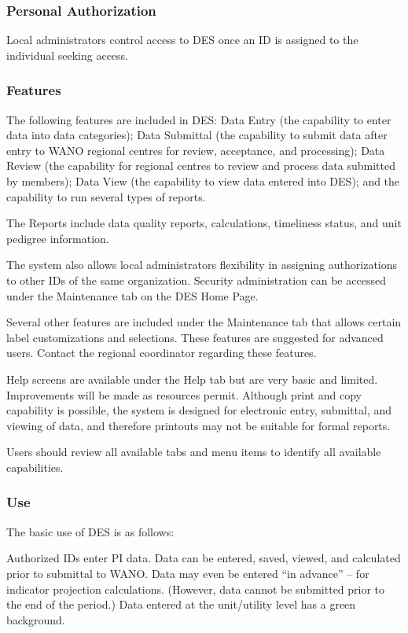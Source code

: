 \subsubsection{Personal Authorization}

Local administrators control access to DES once an ID is assigned to the individual seeking access.

\subsubsection{Features}

The following features are included in DES:  Data Entry (the capability to enter data into data categories); Data Submittal (the capability to submit data after entry to WANO regional centres for review, acceptance, and processing); Data Review (the capability for regional centres to review and process data submitted by members); Data View (the capability to view data entered into DES); and the capability to run several types of reports.

The Reports include data quality reports, calculations, timeliness status, and unit pedigree information.

The system also allows local administrators flexibility in assigning authorizations to other IDs of the same organization.  Security administration can be accessed under the Maintenance tab on the DES Home Page.

Several other features are included under the Maintenance tab that allows certain label customizations and selections. These features are suggested for advanced users.  Contact the regional coordinator regarding these features.

Help screens are available under the Help tab but are very basic and limited. Improvements will be made as resources permit. Although print and copy capability is possible, the system is designed for electronic entry, submittal, and viewing of data, and therefore printouts may not be suitable for formal reports.

Users should review all available tabs and menu items to identify all available capabilities.

\subsubsection{Use}

The basic use of DES is as follows:

Authorized IDs enter PI data. Data can be entered, saved, viewed, and calculated prior to submittal to WANO. Data may even be entered “in advance” – for indicator projection calculations. (However, data cannot be submitted prior to the end of the period.)  Data entered at the unit/utility level has a green background.

